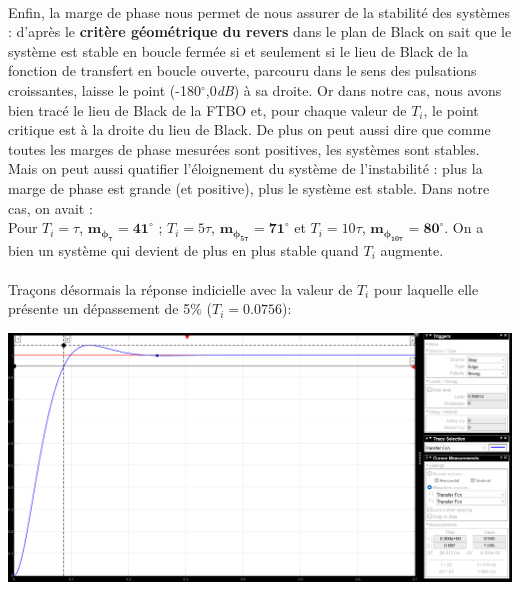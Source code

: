 \documentclass[12pt]{article}
\begin{document}
\\Enfin, la marge de phase nous permet de nous assurer de la stabilité des systèmes : d'après le \textbf{critère géométrique du revers} dans le plan de Black on sait que le système est stable en boucle fermée si et seulement si le lieu de Black de la fonction de transfert en boucle ouverte, parcouru dans le sens des pulsations croissantes, laisse le point (-180$^{\circ}$,0\textit{dB}) à sa droite.
Or dans notre cas, nous avons bien tracé le lieu de Black de la FTBO et, pour chaque valeur de $T_i$, le point critique est à la droite du lieu de Black.
De plus on peut aussi dire que comme toutes les marges de phase mesurées sont positives, les systèmes sont stables. Mais on peut aussi quatifier l'éloignement du système de l'instabilité : plus la marge de phase est grande (et positive), plus le système est stable. Dans notre cas, on avait :
\\Pour $T_i = \tau$, $\mathbf{m_{\phi_{\tau}} = 41^{\circ}}$  ; $T_i = 5\tau$, $\mathbf{m_{\phi_{5\tau}} = 71^{\circ}}$ et $T_i = 10\tau$, $\mathbf{m_{\phi_{10\tau}} = 80^{\circ}}$.
On a bien un système qui devient de plus en plus stable quand $T_i$ augmente.
\\\\Traçons désormais la réponse indicielle avec la valeur de $T_i$ pour laquelle elle présente un dépassement de 5$\%$ ($T_i = 0.0756$): 
\begin{center}
    \includegraphics[width = 16 cm]{TP2 Simulink/Syst_1/dep5prct_syst1.png}
\end{center}
\end{document}
